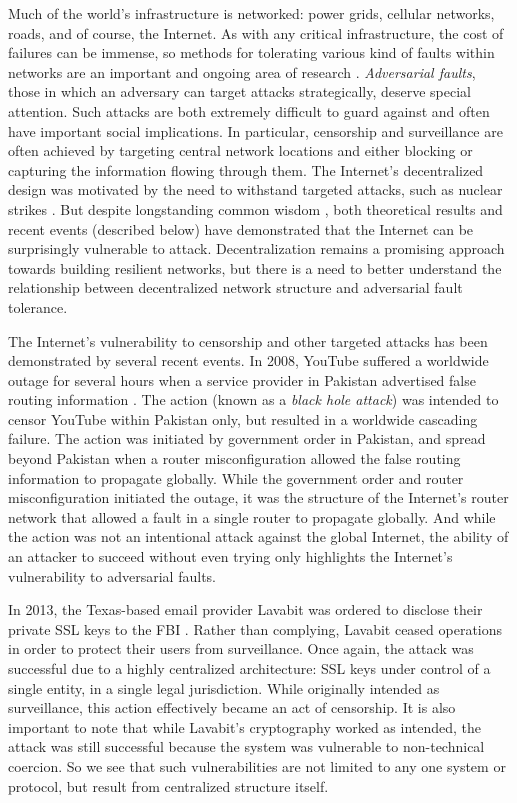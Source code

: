 \documentclass[sigconf]{acmart}
\begin{document}
Much of the world's infrastructure is networked: power grids,
cellular networks, roads, and of course, the Internet.
As with any critical infrastructure, the cost of failures can be
immense, so methods for tolerating various kind of faults within networks are an
important and ongoing area of research
\cite{zin_survey_2015,albert_error_2000,sterbenz_resilience_2010}.
{\em Adversarial faults},
those in which an adversary can target attacks strategically,
deserve special attention.
Such attacks are both extremely difficult to guard against and 
often have important social implications.
In particular, censorship and surveillance are often achieved
by targeting central network locations and either blocking or capturing
the information flowing through them.
The Internet's decentralized design was motivated
by the need to withstand targeted attacks, such as nuclear strikes
\cite{baran_distributed_1964}.
But despite longstanding common wisdom \cite{elmer-dewitt_first_1993},
both theoretical results and recent events (described below)
have demonstrated that the Internet can be surprisingly vulnerable to attack.
Decentralization remains a promising approach towards
building resilient networks,
but there is a need to better understand the relationship between
decentralized network structure and adversarial fault tolerance.

The Internet's vulnerability to censorship and other targeted attacks
has been demonstrated by several recent events.
In 2008, YouTube suffered a worldwide outage for several hours
when a service provider in Pakistan advertised false routing information
\cite{hunter_pakistan_2008}.
The action (known as a {\em black hole attack}) was intended to censor YouTube
within Pakistan only, but resulted in a worldwide cascading failure.
The action was initiated by government order in Pakistan,
and spread beyond Pakistan when a router misconfiguration allowed the false
routing information to propagate globally.
While the government order and router misconfiguration initiated the outage,
it was the structure of the Internet's router network that allowed a fault in a
single router to propagate globally.
And while the action was not an intentional attack against the global Internet,
the ability of an attacker to succeed without even trying only highlights
the Internet's vulnerability to adversarial faults.

In 2013, the Texas-based email provider Lavabit was ordered to disclose
their private SSL keys to the FBI \cite{poulsen_edward_2013}.
Rather than complying,
Lavabit ceased operations
in order to protect their users from surveillance.
Once again, the attack was successful due to a highly centralized
architecture:
SSL keys under control of a single entity, in a single legal jurisdiction.
While originally intended as surveillance,
this action effectively became an act of censorship.
It is also important to note that while Lavabit's cryptography worked as intended,
the attack was still successful because the system was
vulnerable to non-technical coercion.
So we see that such vulnerabilities are not limited to any one system or protocol,
but result from centralized structure itself.
\end{document}
